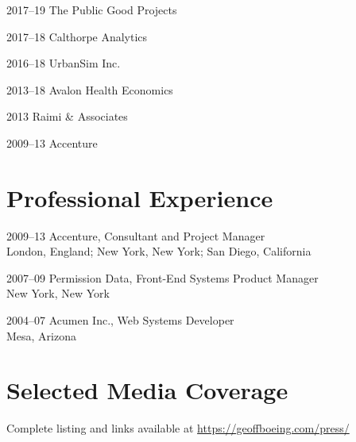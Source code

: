 \documentclass[12pt,letterpaper]{report}
\begin{document}
	\begin{tablist}

		\item[2017--19] \tab The Public Good Projects

		\item[2017--18] \tab Calthorpe Analytics

		\item[2016--18] \tab UrbanSim Inc.

		\item[2013--18] \tab Avalon Health Economics

		\item[2013]     \tab Raimi \& Associates

		\item[2009--13] \tab Accenture

	\end{tablist}



	\section*{Professional Experience}

	\begin{tablist}

		\item[2009--13] \tab Accenture, Consultant and Project Manager\\
							 London, England; New York, New York; San Diego, California

		\item[2007--09] \tab Permission Data, Front-End Systems Product Manager\\
							 New York, New York

		\item[2004--07] \tab Acumen Inc., Web Systems Developer\\
							 Mesa, Arizona

	\end{tablist}



	\section*{Selected Media Coverage}

	Complete listing and links available at \href{https://geoffboeing.com/press/}{https://geoffboeing.com/press/} \bigskip
\end{document}
